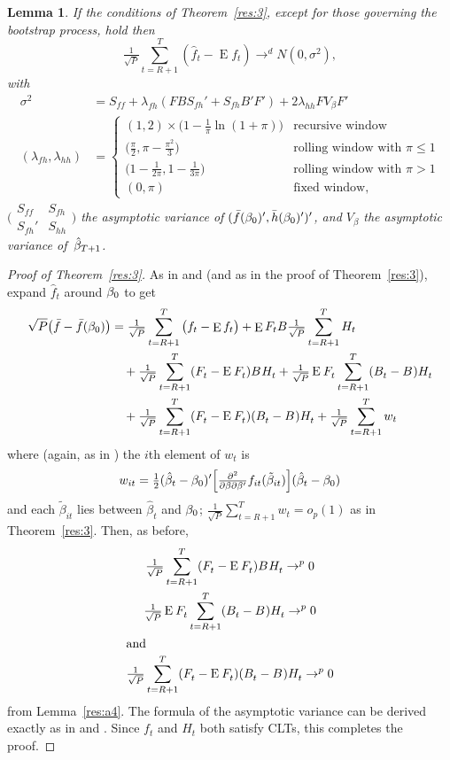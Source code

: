 \documentclass[12pt,fleqn]{article}
\newtheorem{lema}{Lemma}[section]
\theoremstyle{definition}
\DeclareMathOperator{\E}{E}
\newcommand{\btrue}[1][]{\if#1*\hat\beta_{T+1}\else\beta_0\fi}
\newcommand{\osum}[1]{\sum_{#1=R+1}^T}
\newcommand{\oclt}[1]{\tfrac{1}{\sqrt{P}} \osum{#1}}
\newcommand{\clt}{CLT}
\begin{document}
\begin{lema}\label{res:a5}
  If the conditions of Theorem~\ref{res:3}, except for those governing
  the bootstrap process, hold then
  \begin{equation}
    \oclt{t}
    (\hat f_t - \E f_t) \to^d N(0, \sigma^2),
  \end{equation}
  with 
  \begin{align}
  \sigma^2 &= S_{ff} + \lambda_{fh} (F B S_{fh}' + S_{fh} B' F') + 2 \lambda_{hh} F V_\beta F' \\
  (\lambda_{fh}, \lambda_{hh}) &= 
  \begin{cases}
    (1, 2) \times \big(1 - \tfrac{1}{\pi} \ln(1 + \pi)\big) 
      & \text{recursive window} \\
    \big(\tfrac{\pi}{2}, \pi - \tfrac{\pi^2}{3}\big)
      & \text{rolling window with $\pi \leq 1$} \\
    \big(1 - \tfrac{1}{2\pi}, 1 - \tfrac{1}{3\pi}\big)
      & \text{rolling window with $\pi > 1$} \\
    (0, \pi) & \text{fixed window},
  \end{cases}
  \end{align}
  $\Big(\begin{smallmatrix}S_{ff} & S_{fh} \\ S_{fh}' &
    S_{hh} \end{smallmatrix} \Big)$ the asymptotic variance of $(\bar
  f(\btrue)', \bar h(\btrue)')'$, and $V_\beta$ the asymptotic
  variance of~$\btrue[*]$.
\end{lema}

\begin{proof}[Proof of Theorem~\ref{res:3}]
  As in \citet{Wes:96} and \citet{WeM:98} (and as in the proof of
  Theorem~\ref{res:3}), expand $\hat f_t$ around
  $\btrue$ to get
  \begin{align*}
    \sqrt{P} \big(\bar{f} - \bar{f}(\btrue)\big) &= \oclt{t}
    \big(f_t - \E f_t\big) +
    \E F_t B \oclt{t} H_t \\
    & \quad + \WesA + \WesB \\ & \quad + \WesC + \oclt{t} w_t
  \end{align*}
  where (again, as in \citealp{Wes:96}) the $i$th element of $w_t$ is
  \begin{equation*}
    w_{it} = \tfrac12 (\hat\beta_t - \btrue)'
    \Big[\tfrac{\partial^2}{\partial \beta \partial\beta'} 
    f_{it}(\tilde\beta_{it}) \Big]
    (\hat\beta_t - \btrue)
  \end{equation*}
  and each $\tilde\beta_{it}$ lies between $\hat\beta_t$ and
  $\btrue$; $\oclt{t} w_t = o_{p}(1)$ as in Theorem~\ref{res:3}.
  Then, as before,
  \begin{gather}
    \WesA \to^{p} 0 \label{eq:11} \\
    \WesB \to^{p} 0 \label{eq:12}\\
  \intertext{and}
    \WesC \to^{p} 0 \label{eq:13}
  \end{gather}
  from Lemma~\ref{res:a4}.  The formula of the asymptotic variance can
  be derived exactly as in \citet{Wes:96} and \citet{WeM:98}. Since
  $f_t$ and $H_t$ both satisfy \clt s, this completes the
  proof.
\end{proof}


\end{document}
